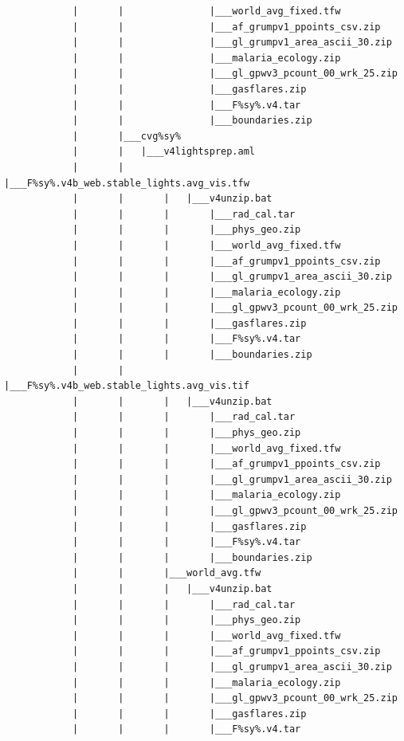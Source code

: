\documentclass[
]{book}
\begin{document}
\begin{verbatim}
            |       |               |___world_avg_fixed.tfw
            |       |               |___af_grumpv1_ppoints_csv.zip
            |       |               |___gl_grumpv1_area_ascii_30.zip
            |       |               |___malaria_ecology.zip
            |       |               |___gl_gpwv3_pcount_00_wrk_25.zip
            |       |               |___gasflares.zip
            |       |               |___F%sy%.v4.tar
            |       |               |___boundaries.zip
            |       |___cvg%sy%
            |       |   |___v4lightsprep.aml
            |       |       |___F%sy%.v4b_web.stable_lights.avg_vis.tfw
            |       |       |   |___v4unzip.bat
            |       |       |       |___rad_cal.tar
            |       |       |       |___phys_geo.zip
            |       |       |       |___world_avg_fixed.tfw
            |       |       |       |___af_grumpv1_ppoints_csv.zip
            |       |       |       |___gl_grumpv1_area_ascii_30.zip
            |       |       |       |___malaria_ecology.zip
            |       |       |       |___gl_gpwv3_pcount_00_wrk_25.zip
            |       |       |       |___gasflares.zip
            |       |       |       |___F%sy%.v4.tar
            |       |       |       |___boundaries.zip
            |       |       |___F%sy%.v4b_web.stable_lights.avg_vis.tif
            |       |       |   |___v4unzip.bat
            |       |       |       |___rad_cal.tar
            |       |       |       |___phys_geo.zip
            |       |       |       |___world_avg_fixed.tfw
            |       |       |       |___af_grumpv1_ppoints_csv.zip
            |       |       |       |___gl_grumpv1_area_ascii_30.zip
            |       |       |       |___malaria_ecology.zip
            |       |       |       |___gl_gpwv3_pcount_00_wrk_25.zip
            |       |       |       |___gasflares.zip
            |       |       |       |___F%sy%.v4.tar
            |       |       |       |___boundaries.zip
            |       |       |___world_avg.tfw
            |       |       |   |___v4unzip.bat
            |       |       |       |___rad_cal.tar
            |       |       |       |___phys_geo.zip
            |       |       |       |___world_avg_fixed.tfw
            |       |       |       |___af_grumpv1_ppoints_csv.zip
            |       |       |       |___gl_grumpv1_area_ascii_30.zip
            |       |       |       |___malaria_ecology.zip
            |       |       |       |___gl_gpwv3_pcount_00_wrk_25.zip
            |       |       |       |___gasflares.zip
            |       |       |       |___F%sy%.v4.tar

\end{verbatim}
\end{document}
